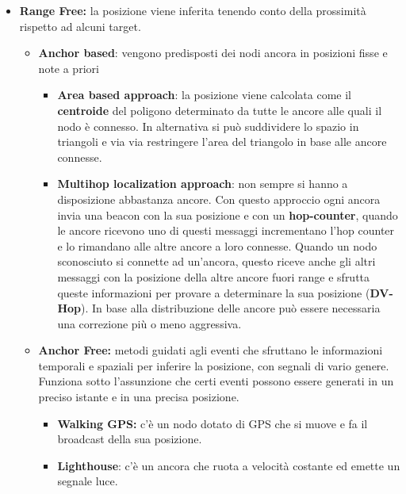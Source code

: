 \begin{itemize}
\item \textbf{Range Free:} la posizione viene inferita tenendo conto della
  prossimità rispetto ad alcuni target.


  \begin{itemize}
  \item \textbf{Anchor based}: vengono predisposti dei nodi ancora in
    posizioni fisse e note a priori


    \begin{itemize}
    \item \textbf{Area based approach}: la posizione viene calcolata come
il \textbf{centroide} del poligono determinato da tutte le ancore
      alle quali il nodo è connesso. In alternativa si può suddividere
      lo spazio in triangoli e via via restringere l'area del triangolo
      in base alle ancore connesse.

    \item \textbf{Multihop localization approach}: non sempre si hanno a
      disposizione abbastanza ancore. Con questo approccio ogni ancora
      invia una beacon con la sua posizione e con un
      \textbf{hop-counter}, quando le ancore ricevono uno di questi
      messaggi incrementano l'hop counter e lo rimandano alle altre
      ancore a loro connesse. Quando un nodo sconosciuto si connette ad
      un'ancora, questo riceve anche gli altri messaggi con la posizione
      della altre ancore fuori range e sfrutta queste informazioni per
      provare a determinare la sua posizione (\textbf{DV-Hop}). In base
      alla distribuzione delle ancore può essere necessaria una
      correzione più o meno aggressiva.

    \end{itemize}
  \item \textbf{Anchor Free:} metodi guidati agli eventi che sfruttano le
    informazioni temporali e spaziali per inferire la posizione, con
    segnali di vario genere. Funziona sotto l'assunzione che certi
    eventi possono essere generati in un preciso istante e in una
    precisa posizione.

    \begin{itemize}
    \item \textbf{Walking GPS:} c'è un nodo dotato di GPS che si muove e fa
      il broadcast della sua posizione.

    \item \textbf{Lighthouse}: c'è un ancora che ruota a velocità costante
      ed emette un segnale luce.

    \end{itemize}
  \end{itemize}
\end{itemize}

